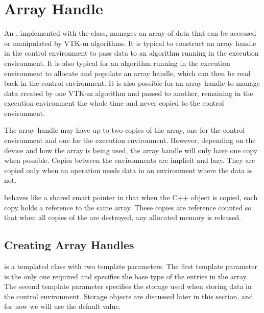 

\section{Array Handle}
\label{sec:ArrayHandle}


An , implemented with the 
class, manages an array of data that can be accessed or manipulated by VTK-m
algorithms. It is typical to construct an array handle in the control
environment to pass data to an algorithm running in the execution
environment. It is also typical for an algorithm running in the execution
environment to allocate and populate an array handle, which can then be
read back in the control environment. It is also possible for an array
handle to manage data created by one VTK-m algorithm and passed to another,
remaining in the execution environment the whole time and never copied to
the control environment.

The array handle may have up to two copies of the array, one for the
control environment and one for the execution environment. However,
depending on the device and how the array is being used, the array handle
will only have one copy when possible. Copies between the environments are
implicit and lazy. They are copied only when an operation needs data in an
environment where the data is not.

 behaves like a shared smart pointer in that when the
C++ object is copied, each copy holds a reference to the same array. These
copies are reference counted so that when all copies of the
 are destroyed, any allocated memory is released.

\subsection{Creating Array Handles}

 is a templated class with two template
parameters. The first template parameter is the only one required and
specifies the base type of the entries in the array. The second template
parameter specifies the storage used when storing data in the control
environment. Storage objects are discussed later in this section, and for
now we will use the default value.

